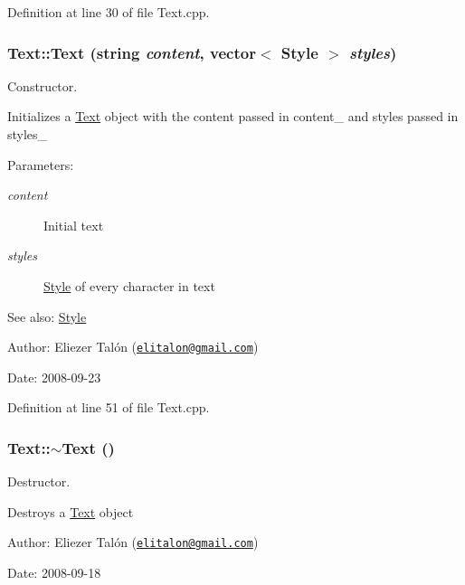 Definition at line 30 of file Text.cpp.\hypertarget{class_text_1016494333aa62e305ec52f587f1cb66}{
\subsubsection[Text]{\setlength{\rightskip}{0pt plus 5cm}Text::Text (string {\em content}, \/  vector$<$ {\bf Style} $>$ {\em styles})}}
\label{class_text_1016494333aa62e305ec52f587f1cb66}


Constructor. 

Initializes a \hyperlink{class_text}{Text} object with the content passed in content\_\- and styles passed in styles\_\-

\begin{Desc}
\item[Parameters:]
\begin{description}
\item[{\em content}]Initial text \item[{\em styles}]\hyperlink{class_style}{Style} of every character in text\end{description}
\end{Desc}
\begin{Desc}
\item[See also:]\hyperlink{class_style}{Style}\end{Desc}
\begin{Desc}
\item[Author:]Eliezer Talón (\href{mailto:elitalon@gmail.com}{\tt elitalon@gmail.com}) \end{Desc}
\begin{Desc}
\item[Date:]2008-09-23 \end{Desc}


Definition at line 51 of file Text.cpp.\hypertarget{class_text_2d49e5c280e205125b149f7777ae30c7}{
\subsubsection[$\sim$Text]{\setlength{\rightskip}{0pt plus 5cm}Text::$\sim$Text ()}}
\label{class_text_2d49e5c280e205125b149f7777ae30c7}


Destructor. 

Destroys a \hyperlink{class_text}{Text} object

\begin{Desc}
\item[Author:]Eliezer Talón (\href{mailto:elitalon@gmail.com}{\tt elitalon@gmail.com}) \end{Desc}
\begin{Desc}
\item[Date:]2008-09-18 \end{Desc}


